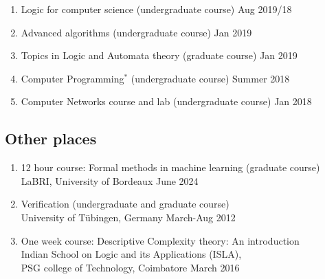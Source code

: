 \documentclass[11pt,a4paper,sans]{moderncv} %
\begin{document}
\begin{enumerate}
					\item {Logic for computer science} (undergraduate course) \hfill Aug 2019/18
					\item {Advanced algorithms} (undergraduate course) \hfill Jan 2019
					\item {Topics in Logic and Automata theory} (graduate course) \hfill Jan 2019
					\item {Computer Programming$^*$} (undergraduate course)  \hfill Summer 2018
					\item {Computer Networks course and lab} (undergraduate course)  \hfill Jan 2018
					\end{enumerate}
					
					\subsection{Other places}
					\begin{enumerate}
					\item 12 hour course: {Formal methods in machine learning} (graduate course) \\
					LaBRI, University of Bordeaux \hfill June 2024
					\item {Verification}  (undergraduate and graduate course)  \\
					University of T\"ubingen, Germany \hfill March-Aug 2012
					\item One week course: {Descriptive Complexity theory: An introduction}  \\
					Indian School on Logic and its Applications (ISLA), \\
					PSG college of Technology, Coimbatore \hfill March 2016
					\end{enumerate}
									
\end{document}
